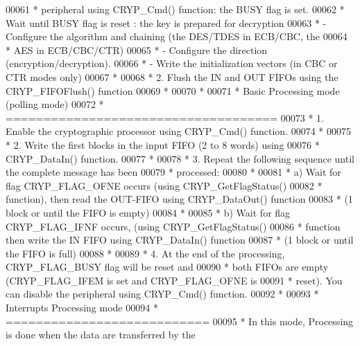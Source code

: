 \begin{DoxyCode}
00061 \textcolor{comment}{  *          peripheral using CRYP\_Cmd() function: the BUSY flag is set. }
00062 \textcolor{comment}{  *          Wait until BUSY flag is reset : the key is prepared for decryption}
00063 \textcolor{comment}{  *       - Configure the algorithm and chaining (the DES/TDES in ECB/CBC, the }
00064 \textcolor{comment}{  *          AES in ECB/CBC/CTR) }
00065 \textcolor{comment}{  *       - Configure the direction (encryption/decryption).}
00066 \textcolor{comment}{  *       - Write the initialization vectors (in CBC or CTR modes only)}
00067 \textcolor{comment}{  *}
00068 \textcolor{comment}{  *    2. Flush the IN and OUT FIFOs using the CRYP\_FIFOFlush() function}
00069 \textcolor{comment}{  *}
00070 \textcolor{comment}{  *}
00071 \textcolor{comment}{  *    Basic Processing mode (polling mode) }
00072 \textcolor{comment}{  *    ====================================  }
00073 \textcolor{comment}{  *    1. Enable the cryptographic processor using CRYP\_Cmd() function.}
00074 \textcolor{comment}{  *}
00075 \textcolor{comment}{  *    2. Write the first blocks in the input FIFO (2 to 8 words) using }
00076 \textcolor{comment}{  *       CRYP\_DataIn() function.}
00077 \textcolor{comment}{  *}
00078 \textcolor{comment}{  *    3. Repeat the following sequence until the complete message has been }
00079 \textcolor{comment}{  *       processed:}
00080 \textcolor{comment}{  *}
00081 \textcolor{comment}{  *       a) Wait for flag CRYP\_FLAG\_OFNE occurs (using CRYP\_GetFlagStatus() }
00082 \textcolor{comment}{  *          function), then read the OUT-FIFO using CRYP\_DataOut() function}
00083 \textcolor{comment}{  *          (1 block or until the FIFO is empty)}
00084 \textcolor{comment}{  *}
00085 \textcolor{comment}{  *       b) Wait for flag CRYP\_FLAG\_IFNF occurs, (using CRYP\_GetFlagStatus() }
00086 \textcolor{comment}{  *          function then write the IN FIFO using CRYP\_DataIn() function }
00087 \textcolor{comment}{  *          (1 block or until the FIFO is full)}
00088 \textcolor{comment}{  *}
00089 \textcolor{comment}{  *    4. At the end of the processing, CRYP\_FLAG\_BUSY flag will be reset and }
00090 \textcolor{comment}{  *        both FIFOs are empty (CRYP\_FLAG\_IFEM is set and CRYP\_FLAG\_OFNE is }
00091 \textcolor{comment}{  *        reset). You can disable the peripheral using CRYP\_Cmd() function.}
00092 \textcolor{comment}{  *}
00093 \textcolor{comment}{  *    Interrupts Processing mode }
00094 \textcolor{comment}{  *    ===========================}
00095 \textcolor{comment}{  *    In this mode, Processing is done when the data are transferred by the }

\end{DoxyCode}
